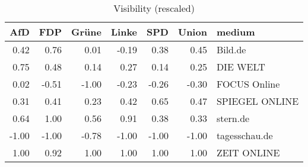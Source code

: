 \begin{table}[ht]
\centering
\begin{tabular}{rrrrrrl}
  \hline
AfD & FDP & Grüne & Linke & SPD & Union & medium \\ 
  \hline
0.42 & 0.76 & 0.01 & -0.19 & 0.38 & 0.45 & Bild.de \\ 
  0.75 & 0.48 & 0.14 & 0.27 & 0.14 & 0.25 & DIE WELT \\ 
  0.02 & -0.51 & -1.00 & -0.23 & -0.26 & -0.30 & FOCUS Online \\ 
  0.31 & 0.41 & 0.23 & 0.42 & 0.65 & 0.47 & SPIEGEL ONLINE \\ 
  0.64 & 1.00 & 0.56 & 0.91 & 0.38 & 0.33 & stern.de \\ 
  -1.00 & -1.00 & -0.78 & -1.00 & -1.00 & -1.00 & tagesschau.de \\ 
  1.00 & 0.92 & 1.00 & 1.00 & 1.00 & 1.00 & ZEIT ONLINE \\ 
   \hline
\end{tabular}
\caption{Visibility (rescaled)} 
\end{table}
